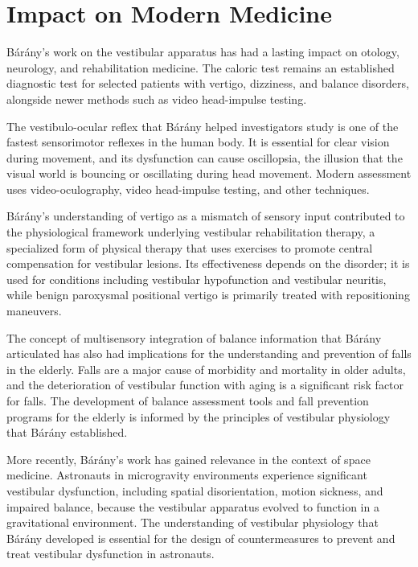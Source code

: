 \section{Impact on Modern Medicine}

B\'ar\'any's work on the vestibular apparatus has had a lasting impact on otology, neurology, and rehabilitation medicine. The caloric test remains an established diagnostic test for selected patients with vertigo, dizziness, and balance disorders, alongside newer methods such as video head-impulse testing.\cite{barany-caloric}

The vestibulo-ocular reflex that B\'ar\'any helped investigators study is one of the fastest sensorimotor reflexes in the human body. It is essential for clear vision during movement, and its dysfunction can cause oscillopsia, the illusion that the visual world is bouncing or oscillating during head movement. Modern assessment uses video-oculography, video head-impulse testing, and other techniques.

B\'ar\'any's understanding of vertigo as a mismatch of sensory input contributed to the physiological framework underlying vestibular rehabilitation therapy, a specialized form of physical therapy that uses exercises to promote central compensation for vestibular lesions. Its effectiveness depends on the disorder; it is used for conditions including vestibular hypofunction and vestibular neuritis, while benign paroxysmal positional vertigo is primarily treated with repositioning maneuvers.

The concept of multisensory integration of balance information that B\'ar\'any articulated has also had implications for the understanding and prevention of falls in the elderly. Falls are a major cause of morbidity and mortality in older adults, and the deterioration of vestibular function with aging is a significant risk factor for falls. The development of balance assessment tools and fall prevention programs for the elderly is informed by the principles of vestibular physiology that B\'ar\'any established.

More recently, B\'ar\'any's work has gained relevance in the context of space medicine. Astronauts in microgravity environments experience significant vestibular dysfunction, including spatial disorientation, motion sickness, and impaired balance, because the vestibular apparatus evolved to function in a gravitational environment. The understanding of vestibular physiology that B\'ar\'any developed is essential for the design of countermeasures to prevent and treat vestibular dysfunction in astronauts.

